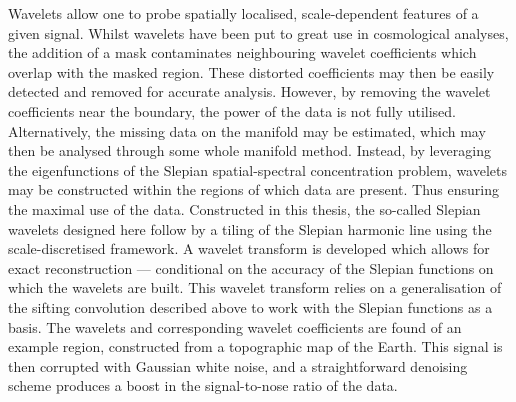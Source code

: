 Wavelets allow one to probe spatially localised, scale-dependent features of a given signal.
Whilst wavelets have been put to great use in cosmological analyses, the addition of a mask contaminates neighbouring wavelet coefficients which overlap with the masked region.
These distorted coefficients may then be easily detected and removed for accurate analysis.
However, by removing the wavelet coefficients near the boundary, the power of the data is not fully utilised.
Alternatively, the missing data on the manifold may be estimated, which may then be analysed through some whole manifold method.
Instead, by leveraging the eigenfunctions of the Slepian spatial-spectral concentration problem, wavelets may be constructed within the regions of which data are present.
Thus ensuring the maximal use of the data.
Constructed in this thesis, the so-called Slepian wavelets designed here follow by a tiling of the Slepian harmonic line using the scale-discretised framework.
A wavelet transform is developed which allows for exact reconstruction --- conditional on the accuracy of the Slepian functions on which the wavelets are built.
This wavelet transform relies on a generalisation of the sifting convolution described above to work with the Slepian functions as a basis.
The wavelets and corresponding wavelet coefficients are found of an example region, constructed from a topographic map of the Earth.
This signal is then corrupted with Gaussian white noise, and a straightforward denoising scheme produces a boost in the signal-to-nose ratio of the data.
